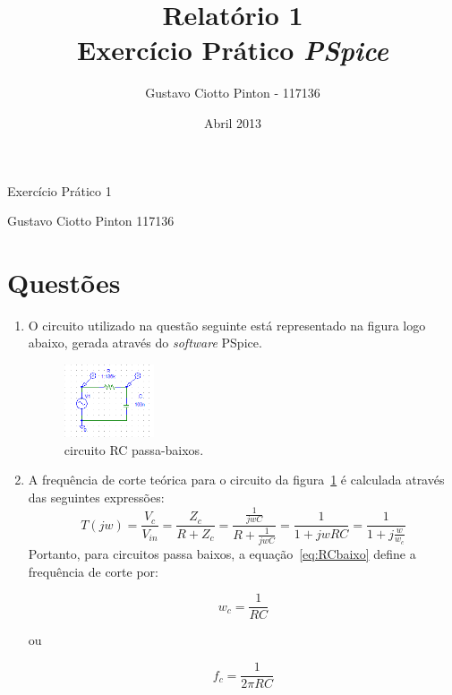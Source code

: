 \documentclass[12pt, a4paper]{article}
\title{Relatório 1\\Exercício Prático \textit{PSpice}}
\author{Gustavo Ciotto Pinton - 117136}
\date{Abril 2013}
\begin{document}
    {\large
    \centerline{Exercício Prático 1}
    \centerline{Gustavo Ciotto Pinton 117136}
    }
    \section*{Questões}
    
    \begin{enumerate}
    
        \item
            O circuito utilizado na questão seguinte está representado na figura logo abaixo, gerada através do \textit{software} PSpice.
            
            \begin{figure}[h!] 
                \centering
                \includegraphics[width=0.250\textwidth]{circ1}
                \caption{circuito RC passa-baixos.}        
                \label{circ1}
            \end{figure}
    
    
        \item A frequência de corte teórica para o circuito da figura~\ref{circ1} é calculada através das seguintes expressões:
            \begin{equation} \label{eq:RCbaixo}
            T(jw)=\frac{V_c}{V_{in}}=\frac{Z_c}{R+Z_c}=\frac{\frac{1}{jwC}}{R+\frac{1}{jwC}}=\frac{1}{1+jwRC}=\frac{1}{1+j\frac{w}{w_c}}
            \end{equation}
            Portanto, para circuitos passa baixos, a equação~\ref{eq:RCbaixo} define a frequência de corte por: 
            
            \begin{equation}
            w_c = \frac{1}{RC}
            \end{equation}
            
            ou
            
            \begin{equation} \label{eq:FreqRC}
            f_c = \frac{1}{2 \pi RC}
            \end{equation}
            

\end{enumerate}
\end{document}
